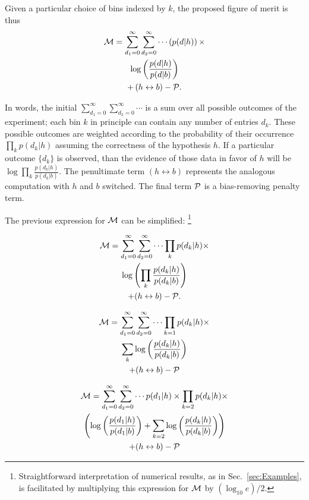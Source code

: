 \documentclass[twocolumn,twoside,prd]{revtex4} %
\newcommand {\footnoteIgnore}[1]{\footnote{#1}}
\begin{document}
Given a particular choice of bins indexed by $k$, the proposed figure of merit is thus
\begin{multline}
\label{eqn:FigureOfMeritComplicated}
{\cal M} =  \sum_{d_1=0}^\infty \sum_{d_2=0}^\infty \cdots 
 \left( { p(d|h)  } \right) \times \\
 \log\left( \frac{p(d|h)}{p(d|b)}\right)  \\
 + \left( h \leftrightarrow b \right) - {\cal P}.
\end{multline}



In words, the initial $\sum_{d_1=0}^\infty \sum_{d_2=0}^\infty \cdots$ is a sum over all possible outcomes of the experiment; each bin $k$ in principle can contain any number of entries $d_k$.  These possible outcomes are weighted according to the probability of their occurrence $\prod_k{ p(d_k|h) }$ assuming the correctness of the hypothesis $h$.  If a particular outcome $\{ d_k \}$ is observed, than the evidence of those data in favor of $h$ will be $\log{\prod_k \frac{p(d_k|h)}{p(d_k|b)}}$.  The penultimate term $\left( h \leftrightarrow b \right)$ represents the analogous computation with $h$ and $b$ switched.  The final term ${\cal P}$ is a bias-removing penalty term.

The previous expression for ${\cal M}$ can be simplified: \footnoteIgnore{Straightforward interpretation of numerical results, as in Sec.~\ref{sec:Examples}, is facilitated by multiplying this expression for ${\cal M}$ by $(\log_{10}{e})/2$.}  

\begin{multline}
\label{eqn:FigureOfMeritComplicated}
{\cal M} =  \sum_{d_1=0}^\infty \sum_{d_2=0}^\infty \cdots 
  \prod_k{ p(d_k|h)  } \times \\
 \log \left( \prod_k \frac{p(d_k|h)}{p(d_k|b)} \right)  \\
 + ( h \leftrightarrow b) - {\cal P}.
\end{multline}


\begin{multline}
\label{eqn:FigureOfMeritComplicated2}
{\cal M}  = \sum_{d_1=0}^\infty \sum_{d_2=0}^\infty \cdots 
  \prod_{k=1}{ p(d_k|h)  } \times \\
 \sum_k \log \left( \frac{p(d_k|h)}{p(d_k|b)} \right)  \\
 + ( h \leftrightarrow b) - {\cal P}\\
\end{multline}

\begin{multline}
\label{eqn:FigureOfMeritComplicated3}
{\cal M}  =  \sum_{d_1=0}^\infty \sum_{d_2=0}^\infty \cdots 
   {p(d_1|h)} \times \prod_{k=2}{ p(d_k|h)  }   \times \\
 \left( \log \left( \frac{p(d_1|h)}{p(d_1|b)} \right) + \sum_{k=2} \log \left( \frac{p(d_k|h)}{p(d_k|b)} \right)\right)  \\
 +  ( h \leftrightarrow b  ) - {\cal P}\\      
\end{multline}
\end{document}
